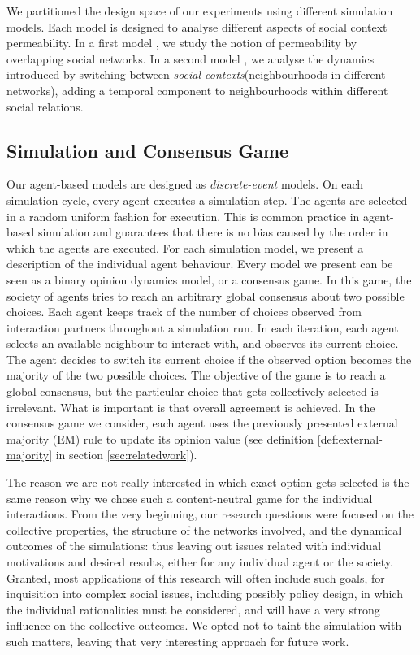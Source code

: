 \documentclass[preprint,number]{elsarticle}
\begin{document}
	We partitioned the design space of our experiments using different simulation models. Each model is designed to analyse different aspects of social context permeability. In a first model \cite{Antunes2007, Antunes2010}, we study the notion of permeability by overlapping social networks. In a second model \cite{Antunes2009}, we analyse the dynamics introduced by switching between \textit{social contexts}(neighbourhoods in different networks), adding a temporal component to neighbourhoods within different social relations. 
	
	\subsection{Simulation and Consensus Game}
	\label{sec:sim_consensus}
	Our agent-based models are designed as \textit{discrete-event} models. On each simulation cycle, every agent executes a simulation step. The agents are selected in a random uniform fashion for execution. This is common practice in agent-based simulation and guarantees that there is no bias caused by the order in which the agents are executed. For each simulation model, we present a description of the individual agent behaviour. Every model we present can be seen as a binary opinion dynamics model, or a consensus game. In this game, the society of agents tries to reach an arbitrary global consensus about two possible choices. Each agent keeps track of the number of choices observed from interaction partners throughout a simulation run. In each iteration, each agent selects an available neighbour to interact with, and observes its current choice. The agent decides to switch its current choice if the observed option becomes the majority of the two possible choices. The objective of the game is to reach a global consensus, but the particular choice that gets collectively selected is irrelevant. What is important is that overall agreement is achieved. In the consensus game we consider, each agent uses the previously presented external majority (EM) rule to update its opinion value (see definition \ref{def:external-majority} in section \ref{sec:relatedwork}).
	
	The reason we are not really interested in which exact option gets selected is the same reason why we chose such a content-neutral game for the individual interactions. From the very beginning, our research questions were focused on the collective properties, the structure of the networks involved, and the dynamical outcomes of the simulations: thus leaving out issues related with individual motivations and desired results, either for any individual agent or the society. Granted, most applications of this research will often include such goals, for inquisition into complex social issues, including possibly policy design, in which the individual rationalities must be considered, and will have a very strong influence on the collective outcomes. We opted not to taint the simulation with such matters, leaving that very interesting approach for future work.
	
\end{document}
